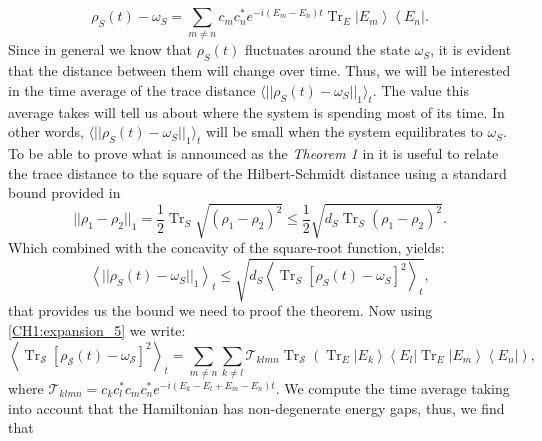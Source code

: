 \begin{equation}
\rho_{S}(t)-\omega_{S}=\sum_{m \neq n} c_{m} c_{n}^{*} e^{-i\left(E_{m}-E_{n}\right) t} \operatorname{Tr}_{E}\left|E_{m}\right\rangle\left\langle E_{n}\right|.
\label{CH1:expansion_5}
\end{equation}
Since in general we know that $\rho_S(t)$ fluctuates around the state $\omega_S$, it is evident that the distance between them will change over time. Thus, we will be interested in the time average of the trace distance $\langle ||\rho_{S}(t)- \omega_{S}||_1\rangle_t$. The value this average takes will tell us about where the system is spending most of its time. In other words, $\langle ||\rho_{S}(t)- \omega_{S}||_1\rangle_t$ will be small when the system equilibrates to $\omega_S$. To be able to prove what is announced as the \textit{Theorem 1} in \cite{linden_quantum_2009} it is useful to relate the trace distance to the square of the Hilbert-Schmidt distance using a standard bound provided in \cite{fuchs_cryptographic_1999}
\begin{equation}
||\rho_{1}-\rho_{2}||_1=\frac{1}{2} \operatorname{Tr}_{S} \sqrt{\left(\rho_{1}-\rho_{2}\right)^{2}} \leq \frac{1}{2} \sqrt{d_{S} \operatorname{Tr}_{S}\left(\rho_{1}-\rho_{2}\right)^{2}}.
\label{CH1:Linden_proof_1}
\end{equation}
Which combined with the concavity of the square-root function, yields:
\begin{equation}
\left\langle ||\rho_{S}(t)- \omega_{S}||_1\right\rangle_{t} \leq \sqrt{d_{S}\left\langle\operatorname{Tr}_{S}\left[\rho_{S}(t)-\omega_{S}\right]^{2}\right\rangle_{t}},
\label{CH1:Linden_proof_2}
\end{equation}
that provides us the bound we need to proof the theorem. Now using \eqref{CH1:expansion_5} we write:
\begin{equation}
\left\langle\operatorname{Tr}_{\mathcal{S}}\left[\rho_{\mathcal{S}}(t)-\omega_{\mathcal{S}}\right]^{2}\right\rangle_{t}=\sum_{m \neq n} \sum_{k \neq l} \mathcal{T}_{k l m n} \operatorname{Tr}_{\mathcal{S}}\left(\operatorname{Tr}_{E}\left|E_{k}\right\rangle\left\langle E_{l}\left|\operatorname{Tr}_{E}\right| E_{m}\right\rangle\left\langle E_{n}\right|\right),
\end{equation}
where $\mathcal{T}_{k l m n}=c_{k} c_{l}^{*} c_{m} c_{n}^{*} e^{-i\left(E_{k}-E_{l}+E_{m}-E_{n}\right) t}$. We compute the time average taking into account that the Hamiltonian has non-degenerate energy gaps, thus, we find that

